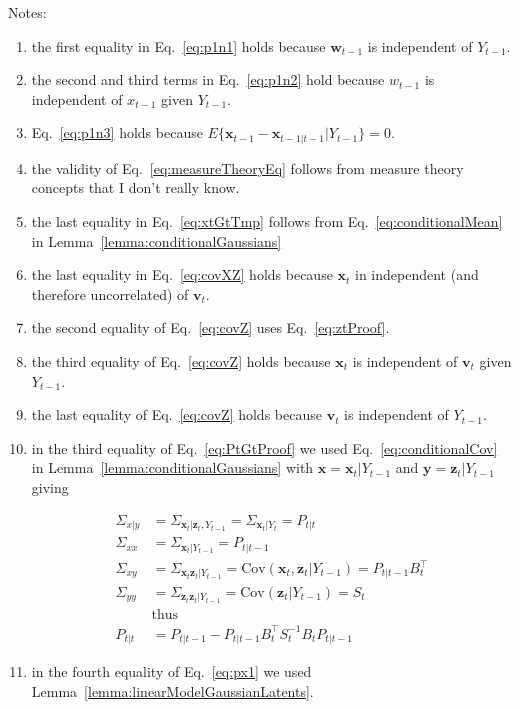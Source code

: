 \documentclass[12pt]{article}
\begin{document}
Notes:
\begin{enumerate}
    \item the first equality in Eq.~\ref{eq:p1n1} holds because
        $\mathbf{w}_{t-1}$ is independent of $Y_{t-1}$.
    \item the second and third terms in Eq.~\ref{eq:p1n2} hold because
        $w_{t-1}$ is independent of $x_{t-1}$ given $Y_{t-1}$.
    \item Eq.~\ref{eq:p1n3} holds because
        $E\{\mathbf{x}_{t-1}-\mathbf{x}_{t-1|t-1}|Y_{t-1}\}=0$.
    \item the validity of Eq.~\ref{eq:measureTheoryEq} follows from measure
        theory concepts that I don't really know.
    \item the last equality in Eq.~\ref{eq:xtGtTmp} follows from Eq.~\ref{eq:conditionalMean} in
        Lemma~\ref{lemma:conditionalGaussians}
    \item the last equality in Eq.~\ref{eq:covXZ} holds because $\mathbf{x}_t$
        in independent (and therefore uncorrelated) of $\mathbf{v}_t$.
    \item the second equality of Eq.~\ref{eq:covZ} uses Eq.~\ref{eq:ztProof}.
    \item the third equality of Eq.~\ref{eq:covZ} holds because $\mathbf{x}_t$
        is independent of $\mathbf{v}_t$ given $Y_{t-1}$.
    \item the last equality of Eq.~\ref{eq:covZ} holds because $\mathbf{v}_t$
        is independent of $Y_{t-1}$.
	\item in the third equality of Eq.~\ref{eq:PtGtProof} we used Eq.~\ref{eq:conditionalCov} in Lemma~\ref{lemma:conditionalGaussians}
	with $\mathbf{x}=\mathbf{x}_t|Y_{t-1}$ and $\mathbf{y}=\mathbf{z}_t|Y_{t-1}$ giving

		\begin{align*}
			\Sigma_{x|y}&=\Sigma_{\mathbf{x}_t|\mathbf{z}_t,Y_{t-1}}=\Sigma_{\mathbf{x}_t|Y_t}=P_{t|t}\\
			\Sigma_{xx}&=\Sigma_{\mathbf{x}_t|Y_{t-1}}=P_{t|t-1}\\
			\Sigma_{xy}&=\Sigma_{\mathbf{x}_t\mathbf{z}_t|Y_{t-1}}=\text{Cov}(\mathbf{x}_t,\mathbf{z}_t|Y_{t-1})=P_{t|t-1}B_t^\intercal\\
			\Sigma_{yy}&=\Sigma_{\mathbf{z}_t\mathbf{z}_t|Y_{t-1}}=\text{Cov}(\mathbf{z}_t|Y_{t-1})=S_t\\
                        &\text{thus}\\
            P_{t|t}&=P_{t|t-1}-P_{t|t-1}B_t^\intercal S_t^{-1}B_tP_{t|t-1}
		\end{align*}
	\item in the fourth equality of Eq.~\ref{eq:px1} we used Lemma~\ref{lemma:linearModelGaussianLatents}.

\end{enumerate}

\pagebreak



\pagebreak



\pagebreak





\end{document}
